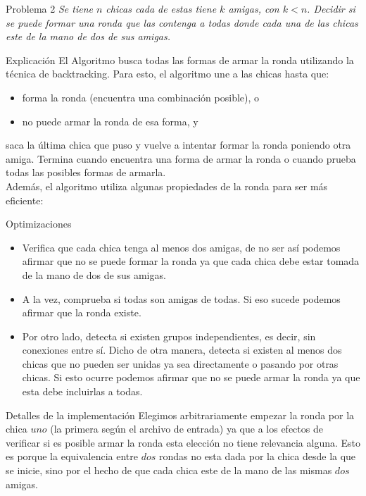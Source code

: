 \begin{section}{Problema 2}
	\textit{Se tiene $n$ chicas cada de estas tiene $k$ amigas, con $k<n$. Decidir si se puede formar una ronda que las contenga a todas donde cada una de las chicas este de la mano de dos de sus amigas.}
	\begin{subsection}{Explicación}
		El Algoritmo busca todas las formas de armar la ronda utilizando la técnica de backtracking. Para esto, el algoritmo une a las chicas hasta que:
		\begin{itemize} \item forma la ronda (encuentra una combinación posible), o \item no puede armar la ronda de esa forma, y\end{itemize}
		
				saca la última chica que puso y vuelve a intentar formar la ronda poniendo otra amiga. Termina cuando encuentra una forma de armar la ronda o cuando prueba todas las posibles formas de armarla.\\
			
		Además, el algoritmo utiliza algunas propiedades de la ronda para ser más eficiente:
		\begin{subsubsection}{Optimizaciones}
		\begin{itemize} \item Verifica que cada chica tenga al menos dos amigas, de no ser así podemos afirmar que no se puede formar la ronda ya que cada chica debe estar tomada de la mano de dos de sus amigas.
				\item A la vez, comprueba si todas son amigas de todas. Si eso sucede podemos afirmar que la ronda existe.
				\item Por otro lado, detecta si existen grupos independientes, es decir, sin conexiones entre sí. Dicho de otra manera, detecta si existen al menos dos chicas que no pueden ser unidas ya sea directamente o pasando por otras chicas. Si esto ocurre podemos afirmar que no se puede armar la ronda ya que esta debe incluirlas a todas. 
		\end{itemize}
			
		\end{subsubsection}
	\end{subsection}
	\begin{subsection}{Detalles de la implementación}
		Elegimos arbitrariamente empezar la ronda por la chica $uno$ (la primera según el archivo de entrada) ya que a los efectos de verificar si es posible armar la ronda esta elección no tiene relevancia alguna. Esto es porque la equivalencia entre $dos$ rondas no esta dada por la chica desde la que se inicie, sino por el hecho de que cada chica este de la mano de las mismas $dos$ amigas.\\\\
	

\end{subsection}
\end{section}
